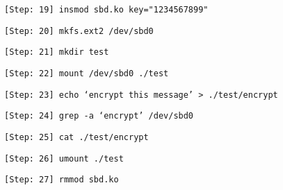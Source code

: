 \documentclass[10pt,letterpaper,draftclsnofoot,onecolumn]{IEEEtran}
\begin{document}
\begin{description}
\item \texttt{[Step: 19] insmod sbd.ko key="1234567899"} 
\item \texttt{[Step: 20] mkfs.ext2 /dev/sbd0}
\item \texttt{[Step: 21] mkdir test}
\item \texttt{[Step: 22] mount /dev/sbd0 ./test}
\item \texttt{[Step: 23] echo ‘encrypt this message’ > ./test/encrypt}
\item \texttt{[Step: 24] grep -a ‘encrypt’ /dev/sbd0}
\item \texttt{[Step: 25] cat ./test/encrypt}
\item \texttt{[Step: 26] umount ./test}
\item \texttt{[Step: 27] rmmod sbd.ko}

\end{description}



\end{document}
